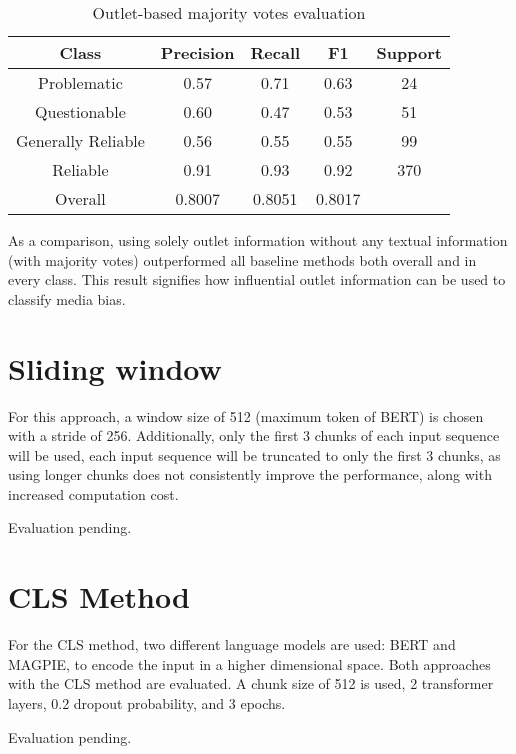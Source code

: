 \begin{table}[htbp]
    \centering
    \begin{tabular}{|| c | c | c | c | c ||}
        \hline
        Class              & Precision & Recall & F1     & Support \\
        \hline
        \hline
        Problematic        & 0.57      & 0.71   & 0.63   & 24      \\
        \hline
        Questionable       & 0.60      & 0.47   & 0.53   & 51      \\
        \hline
        Generally Reliable & 0.56      & 0.55   & 0.55   & 99      \\
        \hline
        Reliable           & 0.91      & 0.93   & 0.92   & 370     \\
        \hline
        Overall            & 0.8007    & 0.8051 & 0.8017 &         \\
        \hline
    \end{tabular}
    \caption{Outlet-based majority votes evaluation}
    \label{table:majority-votes-eval}
\end{table}



As a comparison, using solely outlet information without any textual information (with majority votes) outperformed all baseline methods both overall and in every class. This result signifies how influential outlet information can be used to classify media bias.

\begin{comment}
Find out why TF-IDF performs worse on class problematic
\end{comment}


\section{Sliding window}

For this approach, a window size of 512 (maximum token of BERT) is chosen with a stride of 256. Additionally, only the first 3 chunks of each input sequence will be used, each input sequence will be truncated to only the first 3 chunks, as using longer chunks does not consistently improve the performance, along with increased computation cost.

Evaluation pending.

\section{CLS Method}

For the CLS method, two different language models are used: BERT and MAGPIE, to encode the input in a higher dimensional space. Both approaches with the CLS method are evaluated. A chunk size of 512 is used, 2 transformer layers, 0.2 dropout probability, and 3 epochs.

Evaluation pending.


